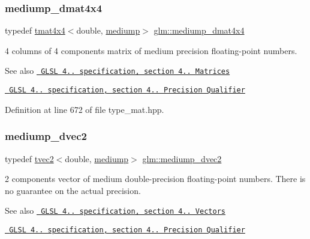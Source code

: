 \subsubsection{\texorpdfstring{mediump\_dmat4x4}{mediump\_dmat4x4}}
{\footnotesize\ttfamily typedef \mbox{\hyperlink{structglm_1_1tmat4x4}{tmat4x4}}$<$double, \mbox{\hyperlink{namespaceglm_a0f04f086094c747d227af4425893f545a6416f3ea0c9025fb21ed50c4d6620482}{mediump}}$>$ \mbox{\hyperlink{group__core__precision_ga6dc4057e30931ebd0b5d7e44ef27763a}{glm\+::mediump\+\_\+dmat4x4}}}

4 columns of 4 components matrix of medium precision floating-\/point numbers.

\begin{DoxySeeAlso}{See also}
\href{http://www.opengl.org/registry/doc/GLSLangSpec.4.20.8.pdf}{\texttt{ G\+L\+SL 4.. specification, section 4.. Matrices}} 

\href{http://www.opengl.org/registry/doc/GLSLangSpec.4.20.8.pdf}{\texttt{ G\+L\+SL 4.. specification, section 4.. Precision Qualifier}} 
\end{DoxySeeAlso}


Definition at line 672 of file type\+\_\+mat.\+hpp.

\mbox{\label{group__core__precision_gafc1ed63d5e5d1ddcf67752143f4f5871}} 
\subsubsection{\texorpdfstring{mediump\_dvec2}{mediump\_dvec2}}
{\footnotesize\ttfamily typedef \mbox{\hyperlink{structglm_1_1tvec2}{tvec2}}$<$double, \mbox{\hyperlink{namespaceglm_a0f04f086094c747d227af4425893f545a6416f3ea0c9025fb21ed50c4d6620482}{mediump}}$>$ \mbox{\hyperlink{group__core__precision_gafc1ed63d5e5d1ddcf67752143f4f5871}{glm\+::mediump\+\_\+dvec2}}}

2 components vector of medium double-\/precision floating-\/point numbers. There is no guarantee on the actual precision.

\begin{DoxySeeAlso}{See also}
\href{http://www.opengl.org/registry/doc/GLSLangSpec.4.20.8.pdf}{\texttt{ G\+L\+SL 4.. specification, section 4.. Vectors}} 

\href{http://www.opengl.org/registry/doc/GLSLangSpec.4.20.8.pdf}{\texttt{ G\+L\+SL 4.. specification, section 4.. Precision Qualifier}} 
\end{DoxySeeAlso}



